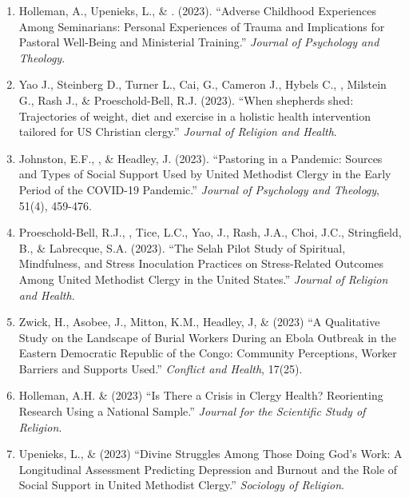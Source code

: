\begin{enumerate}
\item Holleman, A., Upenieks, L., \& \Eagle. (2023). ``Adverse Childhood Experiences Among Seminarians: Personal Experiences of Trauma and Implications for Pastoral Well-Being and Ministerial Training.'' \textit{Journal of Psychology and Theology}. 

\item Yao J., Steinberg D., Turner L., Cai, G., Cameron J., Hybels C., \Eagle, Milstein G., Rash J., \& Proeschold-Bell, R.J. (2023). ``When shepherds shed: Trajectories of weight, diet and exercise in a holistic health intervention tailored for US Christian clergy.'' \textit{Journal of Religion and Health}. 

\item Johnston, E.F., \Eagle, \& Headley, J. (2023). ``Pastoring in a Pandemic: Sources and Types of Social Support Used by United Methodist Clergy in the Early Period of the COVID-19 Pandemic.'' \textit{Journal of Psychology and Theology}, 51(4), 459-476. 
	
\item Proeschold-Bell, R.J., \Eagle, Tice, L.C., Yao, J., Rash, J.A., Choi, J.C., Stringfield, B., \& Labrecque, S.A. (2023). ``The Selah Pilot Study of Spiritual, Mindfulness, and Stress Inoculation Practices on Stress-Related Outcomes Among United Methodist Clergy in the United States.'' \textit{Journal of Religion and Health}. 
	
\item Zwick, H., Asobee, J., Mitton, K.M., Headley, J, \& \Eagle\CS \hspace{0.1em} (2023) ``A Qualitative Study on the Landscape of Burial Workers During an Ebola Outbreak in the Eastern Democratic Republic of the Congo: Community Perceptions, Worker Barriers and Supports Used.''  \textit{Conflict and Health}, 17(25). 

\item Holleman, A.H. \& \Eagle\hspace{.01em} (2023) ``Is There a Crisis in Clergy Health? Reorienting Research Using a National Sample.'' \textit{Journal for the Scientific Study of Religion}. 

\item Upenieks, L., \& \Eagle\hspace{0.1em} (2023) ``Divine Struggles Among Those Doing God’s Work: A Longitudinal Assessment Predicting Depression and Burnout and the Role of Social Support in United Methodist Clergy.'' \textit{Sociology of Religion}.  


\end{enumerate}
